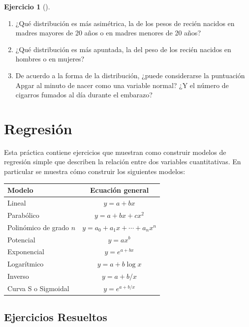 \documentclass[
  a4paper,
]{scrreport}
\theoremstyle{definition}
\newtheorem{exercise}{Ejercicio}[chapter]
\theoremstyle{remark}
\begin{document}
\begin{exercise}[]
\begin{enumerate}
  Calcular el coeficiente de asimetría y de apuntamiento muestrales del
  peso de los recién nacidos e interpretarlos.
\item
  ¿Qué distribución es más asimétrica, la de los pesos de recién nacidos
  en madres mayores de 20 años o en madres menores de 20 años?
\item
  ¿Qué distribución es más apuntada, la del peso de los recién nacidos
  en hombres o en mujeres?
\item
  De acuerdo a la forma de la distribución, ¿puede considerarse la
  puntuación Apgar al minuto de nacer como una variable normal? ¿Y el
  número de cigarros fumados al día durante el embarazo?
\end{enumerate}

\end{exercise}


\chapter{Regresión}\label{regresiuxf3n}

Esta práctica contiene ejercicios que muestran como construir modelos de
regresión simple que describen la relación entre dos variables
cuantitativas. En particular se muestra cómo construir los siguientes
modelos:

\begin{longtable}[]{@{}lc@{}}
\toprule\noalign{}
Modelo & Ecuación general \\
\midrule\noalign{}
\endhead
\bottomrule\noalign{}
\endlastfoot
Lineal & \(y=a+bx\) \\
Parabólico & \(y=a+bx+cx^2\) \\
Polinómico de grado \(n\) & \(y=a_0+a_1x+\cdots+a_nx^n\) \\
Potencial & \(y=ax^b\) \\
Exponencial & \(y=e^{a+bx}\) \\
Logarítmico & \(y=a+b\log x\) \\
Inverso & \(y=a+b/x\) \\
Curva S o Sigmoidal & \(y= e^{a+b/x}\) \\
\end{longtable}

\section{Ejercicios Resueltos}\label{ejercicios-resueltos-4}
\end{document}
